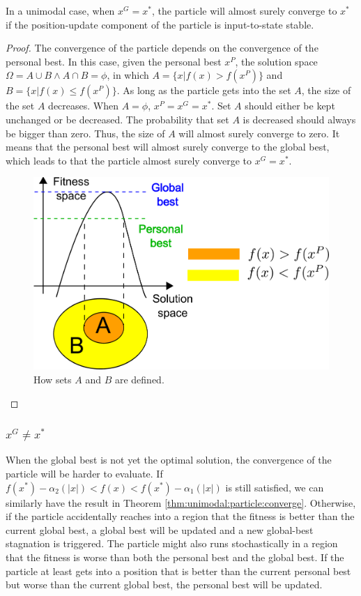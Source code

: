 \begin{mythm}
\label{thm:unimodal:particle:converge}
In a unimodal case, when $ x^{G} = x^{*} $, the particle will almost surely converge to $ x^{*} $ if the position-update component of the particle is input-to-state stable.
\begin{proof}
The convergence of the particle depends on the convergence of the personal best.
In this case, given the personal best $ x^{P} $, the solution space $ \Omega = A \cup B \land A \cap B = \phi $, in which 
$ A = \{ x | f(x) > f(x^{P}) \} $ and $ B = \{ x | f(x) \leq f(x^{P}) \} $.
As long as the particle gets into the set $ A $, the size of the set $ A $ decreases.
When $ A = \phi $, $ x^{P} = x^{G} = x^{*} $.
Set $ A $ should either be kept unchanged or be decreased.
The probability that set $ A $ is decreased should always be bigger than zero.
Thus, the size of $ A $ will almost surely converge to zero.
It means that the personal best will almost surely converge to the global best, which leads to that the particle almost surely converge to $ x^{G}  = x^{*} $.

\begin{figure}[tbph]
\centering
\includegraphics[width=0.7\linewidth]{./fig/two_sets_split}
\caption{How sets $ A $ and $ B $ are defined.}
\label{fig:two_sets_split}
\end{figure}

\end{proof}
\end{mythm}

\subsubsection{ $ x^{G} \neq x^{*}  $ }

When the global best is not yet the optimal solution, the convergence of the particle will be harder to evaluate.
If  $ f(x^{*}) - \alpha_{2} ( |x| ) <  f(x) < f(x^{*}) - \alpha_{1} ( |x| ) $ is still satisfied, we can similarly have the result in Theorem \ref{thm:unimodal:particle:converge}.
Otherwise, if the particle accidentally reaches into a region that the fitness is better than the current global best, a global best will be updated and a new global-best stagnation is triggered.
The particle might also runs stochastically in a region that the fitness is worse than both the personal best and the global best.
If the particle at least gets into a position that is better than the current personal best but worse than the current global best, the personal best will be updated. 

